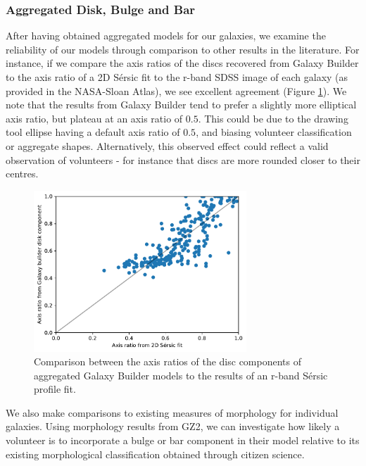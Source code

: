\documentclass[../main.tex]{subfiles}
\begin{document}
\subsubsection{Aggregated Disk, Bulge and Bar}
After having obtained aggregated models for our galaxies, we examine the reliability of our models through comparison to other results in the literature. For instance, if we compare the axis ratios of the discs recovered from Galaxy Builder to the axis ratio of a 2D S\'ersic fit to the r-band SDSS image of each galaxy (as provided in the NASA-Sloan Atlas), we see excellent agreement (Figure \ref{fig:ax_ratio_comparison}). We note that the results from Galaxy Builder tend to prefer a slightly more elliptical axis ratio, but plateau at an axis ratio of $0.5$. This could be due to the drawing tool ellipse having a default axis ratio of $0.5$, and biasing volunteer classification or aggregate shapes. Alternatively, this observed effect could reflect a valid observation of volunteers - for instance that discs are more rounded closer to their centres.


\begin{figure}
  \includegraphics[width=8cm]{images__results/GZBvsNSA_ax-ratio_SERSIC_BA.pdf}
  \caption{Comparison between the axis ratios of the disc components of aggregated Galaxy Builder models to the results of an r-band S\'ersic profile fit.}
  \label{fig:ax_ratio_comparison}
\end{figure}

We also make comparisons to existing measures of morphology for individual galaxies. Using morphology results from GZ2, we can investigate how likely a volunteer is to incorporate a bulge or bar component in their model relative to its existing morphological classification obtained through citizen science.
\end{document}
